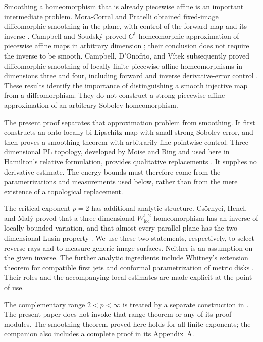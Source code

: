 \documentclass[11pt]{article}
\numberwithin{equation}{section}
\theoremstyle{definition}
\theoremstyle{remark}
\begin{document}
Smoothing a homeomorphism that is already piecewise affine is an
important intermediate problem. Mora-Corral and Pratelli obtained
fixed-image diffeomorphic smoothing in the plane, with control of the
forward map and its inverse \cite{MoraCorralPratelli2014}.
Campbell and Soudsk\'y proved $C^1$ homeomorphic approximation of
piecewise affine maps in arbitrary dimension
\cite{CampbellSoudsky2021}; their conclusion does not require the
inverse to be smooth. Campbell, D'Onofrio, and V\'itek subsequently
proved diffeomorphic smoothing of locally finite piecewise affine
homeomorphisms in dimensions three and four, including forward and
inverse derivative-error control
\cite[Theorem~A]{CampbellDOnofrioVitek2026}. These results identify
the importance of distinguishing a smooth injective map from a
diffeomorphism. They do not construct a strong piecewise affine
approximation of an arbitrary Sobolev homeomorphism.

The present proof separates that approximation problem from smoothing.
It first constructs an onto locally bi-Lipschitz map with small strong
Sobolev error, and then proves a smoothing theorem with arbitrarily
fine pointwise control. Three-dimensional PL topology, developed by
Moise and Bing and used here in Hamilton's relative formulation,
provides qualitative replacements
\cite{Moise1952Approximation,Moise1952Triangulation,Bing1959,Hamilton1976}.
It supplies no derivative estimate. The energy bounds must therefore
come from the parametrizations and measurements used below, rather
than from the mere existence of a topological replacement.

The critical exponent $p=2$ has additional analytic structure.
Cs\"ornyei, Hencl, and Mal\'y proved that a three-dimensional
$W^{1,2}_{\mathrm{loc}}$ homeomorphism has an inverse of locally
bounded variation, and that almost every parallel plane has the
two-dimensional Lusin property
\cite[Theorems~1.1 and~1.3]{CsornyeiHenclMaly2010}. We use these two
statements, respectively, to select reverse rays and to measure
generic image surfaces. Neither is an assumption on the given inverse.
The further analytic ingredients include Whitney's extension theorem
for compatible first jets \cite{Whitney1934} and conformal
parametrization of metric disks \cite{AhlforsBers1960,McMullen2023}.
Their roles and the accompanying local estimates are made explicit
at the point of use.

The complementary range $2<p<\infty$ is treated by a separate
construction in \cite[Theorem~1.1]{OpenAIHigh2026}. The present paper does
not invoke that range theorem or any of its proof modules. The smoothing
theorem proved here holds for all finite exponents; the companion also
includes a complete proof in its Appendix~A.
\end{document}
